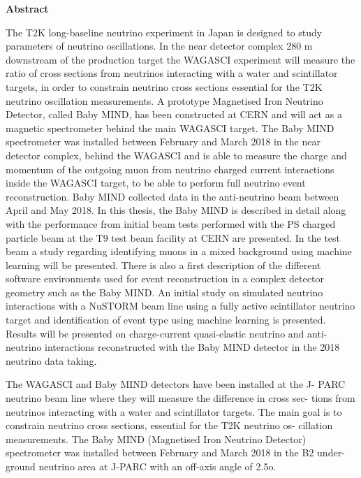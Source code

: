 \vspace*{1.75in}
\begin{center} {\bf Abstract}\end{center}

The T2K long-baseline neutrino experiment in Japan is designed to study parameters of neutrino oscillations. In the near detector complex 280 m downstream of the production target the WAGASCI experiment will measure the ratio of cross sections from neutrinos interacting with a water and scintillator targets, in order to constrain neutrino cross sections essential for the T2K neutrino oscillation measurements. A prototype Magnetised Iron Neutrino Detector, called Baby MIND, has been constructed at CERN and will act as a magnetic spectrometer behind the main WAGASCI target. The Baby MIND spectrometer was installed between February and March 2018 in the near detector complex, behind the WAGASCI and is able to measure the charge and momentum of the outgoing muon from neutrino charged current interactions inside the WAGASCI target, to be able to perform full neutrino event reconstruction. Baby MIND collected data in the anti-neutrino beam between April and May 2018. In this thesis, the Baby MIND is described in detail along with the performance from initial beam tests performed with the PS charged particle beam at the T9 test beam facility at CERN are presented. In the test beam a study regarding identifying muons in a mixed background using machine learning will be presented. There is also a first description of the different software environments used for event reconstruction in a complex detector geometry such as the Baby MIND. An initial study on simulated neutrino interactions with a NuSTORM beam line using a fully active scintillator neutrino target and identification of event type using machine learning is presented. Results will be presented on charge-current quasi-elastic neutrino and anti-neutrino interactions reconstructed with the Baby MIND detector in the 2018 neutrino data taking.


The WAGASCI and Baby MIND detectors have been installed at the J- PARC neutrino beam line where they will measure the difference in cross sec- tions from neutrinos interacting with a water and scintillator targets. 
The main goal is to constrain neutrino cross sections, essential for the T2K neutrino os- cillation measurements. 
The Baby MIND (Magnetised Iron Neutrino Detector) spectrometer was installed between February and March 2018 in the B2 under- ground neutrino area at J-PARC with an off-axis angle of 2.5o. 


